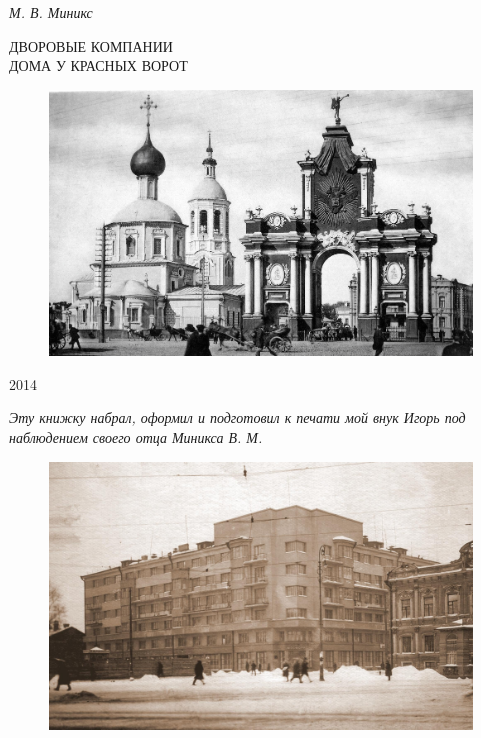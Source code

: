 
\thispagestyle{empty} 

\begin{center}

\vspace{35pt}

\textit{ \Large{ М. В. Миникс}}

\vfill

\large ДВОРОВЫЕ КОМПАНИИ \\ ДОМА У КРАСНЫХ ВОРОТ

\vfill

\begin{figure}[ht]
  \centering
  \includegraphics[width=\textwidth]{inc/1/1}
\end{figure}

\vfill

2014

\end{center}

\newpage

\thispagestyle{empty} 



\vspace*{70pt}

\noindent
\begin{center}
\begin{minipage}{65mm}
\textit{Эту книжку набрал, оформил и подготовил к печати мой внук Игорь  под наблюдением своего отца Миникса В. М.}
\end{minipage}
\end{center}

\vspace{49pt}

\begin{figure}[h!]
  \centering
  \includegraphics[width=\textwidth]{inc/2/1}
\end{figure}

\newpage
